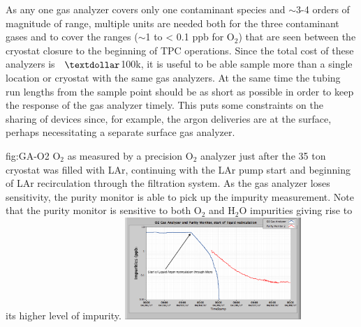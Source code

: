 As any one gas analyzer covers only one contaminant species and $\sim$3-4 orders of magnitude of range, multiple units are needed both for the three contaminant gases and to cover the ranges ($\sim$1 to < 0.1 ppb for $\text{O}_2$) that are seen between the cryostat closure to the beginning of TPC operations. Since the total cost of these analyzers is $\>$ $\textdollar$100k, it is useful to be able sample more than a single location or cryostat with the same gas analyzers. At the same time the tubing run lengths from the sample point should be as short as possible in order to keep the response of the gas analyzer timely. This puts some constraints on the sharing of devices since, for example, the argon deliveries are at the surface, perhaps necessitating a separate surface gas analyzer.

\begin{dunefigure}{fig:GA-O2}
  {$\text{O}_2$ as measured by a precision $\text{O}_2$ analyzer just after the 35 ton cryostat was filled with LAr, continuing with the LAr pump start and beginning of LAr recirculation through the filtration system. As the gas analyzer loses sensitivity, the purity monitor is able to pick up the impurity measurement. Note that the purity monitor is sensitive to both $\text{O}_2$ and $\text{H}_2\text{O}$ impurities giving rise to its higher level of impurity.}
  \includegraphics[width=0.5\textwidth]{figures/O2AnalyzerPrM2_HVRun1.png}%
\end{dunefigure}
